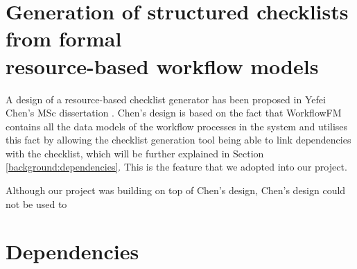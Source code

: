 

\section{Generation of structured checklists from formal \\resource-based workflow models}
\label{background:chens_design}

A design of a resource-based checklist generator has been proposed in Yefei Chen's MSc dissertation \cite{checklistdesign}.
Chen's design is based on the fact that WorkflowFM contains all the data models of the workflow processes in the system and utilises this fact by allowing the checklist generation tool being able to link dependencies with the checklist, which will be further explained in Section \ref{background:dependencies}. This is the feature that we adopted into our project.

Although our project was building on top of Chen's design, Chen's design could not be used to 


\section{Dependencies}

